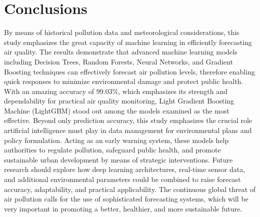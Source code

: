 \documentclass[conference]{IEEEtran}
\begin{document}
\section{Conclusions}
By means of historical pollution data and meteorological considerations, this study emphasizes the great capacity of machine learning in efficiently forecasting air quality. The results demonstrate that advanced machine learning models including Decision Trees, Random Forests, Neural Networks, and Gradient Boosting techniques can effectively forecast air pollution levels, therefore enabling quick responses to minimize environmental damage and protect public health. With an amazing accuracy of 99.03\%, which emphasizes its strength and dependability for practical air quality monitoring, Light Gradient Boosting Machine (LightGBM) stood out among the models examined as the most effective. Beyond only prediction accuracy, this study emphasizes the crucial role artificial intelligence must play in data management for environmental plans and policy formulation. Acting as an early warning system, these models help authorities to regulate pollution, safeguard public health, and promote sustainable urban development by means of strategic interventions. Future research should explore how deep learning architectures, real-time sensor data, and additional environmental parameters could be combined to raise forecast accuracy, adaptability, and practical applicability. The continuous global threat of air pollution calls for the use of sophisticated forecasting systems, which will be very important in promoting a better, healthier, and more sustainable future.
\end{document}
